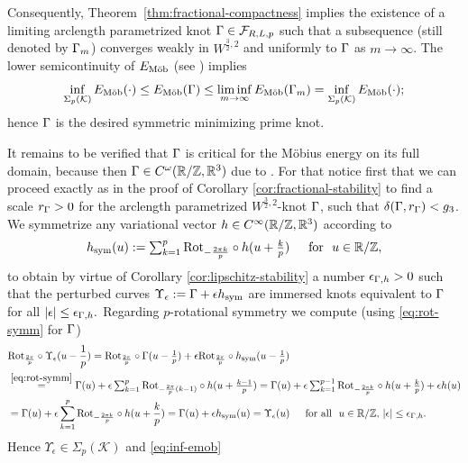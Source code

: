 Consequently, Theorem~\ref{thm:fractional-compactness} implies the existence
of a limiting arclength parametrized knot $\Gamma\in\mathcal{F}_{R,L,p}$ such that
a subsequence (still denoted by $\Gamma_m$) converges weakly in 
$W^{\frac32,2}$ and uniformly to $\Gamma$ as $m\to\infty$.
The 
lower semicontinuity of ${E_\textnormal{M\"ob}}$ (see \cite[Lemma 4.2]{freedman-etal_1994})
implies
\begin{equation}\label{eq:inf-emob}
\inf_{\Sigma_p(\mathcal{K})}{E_\textnormal{M\"ob}}(\cdot)
\le{E_\textnormal{M\"ob}}(\Gamma)\le\liminf_{m\to\infty}{E_\textnormal{M\"ob}}(\Gamma_m)=\inf_{\Sigma_p(\mathcal{K})}
{E_\textnormal{M\"ob}}(\cdot);
\end{equation}
hence $\Gamma$ is the desired symmetric minimizing prime knot.

It remains to be verified that $\Gamma$ is critical for the M\"obius energy on its full domain, because then $\Gamma\in C^\omega(\mathbb{R}/\mathbb{Z},\mathbb{R}^3)$ due to
\cite[Corollary 1.3]{blatt-vorderobermeier_2019}.
For that notice first that we can proceed exactly as
in the proof of Corollary \ref{cor:fractional-stability}
to find a scale $r_\Gamma>0$ for
the arclength parametrized $W^{\frac32,2}$-knot $\Gamma$, such that
$\delta(\Gamma,r_\Gamma)< g_3$.
We symmetrize any variational vector $h\in C^\infty(\mathbb{R}/\mathbb{Z},\mathbb{R}^3)$ according to
\begin{equation}\label{eq:symmetrize}
\textstyle
h_\textnormal{sym}(u):=\sum_{k=1}^p{\textnormal{Rot}}_{-\frac{2\pi k}p}\circ h(u+\frac{k}p)
\quad\,\,\,\text{for }\,\, u\in\mathbb{R}/\mathbb{Z},
\end{equation}
to obtain by virtue of Corollary \ref{cor:lipschitz-stability}
a number $\epsilon_{\Gamma,h}>0$ such that the perturbed curves
$\Upsilon_\epsilon:=\Gamma+\epsilon h_\textnormal{sym}$ are immersed knots
equivalent to $\Gamma$ for all $|\epsilon|\le\epsilon_{\Gamma,h}.$
Regarding $p$-rotational symmetry we compute (using \eqref{eq:rot-symm} for
$\Gamma$)
\begin{align*}
\textstyle
&{\textnormal{Rot}}_{\frac{2\pi}p}\circ\Upsilon_\epsilon(u-\frac1{p})
\textstyle
={\textnormal{Rot}}_{\frac{2\pi}p}\circ\Gamma(u-\frac1p)+\epsilon{\textnormal{Rot}}_{\frac{2\pi}p}\circ
h_\textnormal{sym}(u-\frac1p)\\
&\textstyle\overset{\eqref{eq:rot-symm}}{=}
\Gamma(u)+\epsilon\sum_{k=1}^p{\textnormal{Rot}}_{-\frac{2\pi}p(k-1)}\circ
h(u+\frac{k-1}p)
= \Gamma(u)+\epsilon\sum_{k=1}^{p-1}{\textnormal{Rot}}_{-\frac{2\pi k}p}
\circ h(u+\frac{k}p)+\epsilon h(u)\\
&=\Gamma(u)+\epsilon\sum_{k=1}^p
{\textnormal{Rot}}_{-\frac{2\pi k}p}\circ h(u+\frac{k}p)
 = \Gamma(u)+\epsilon h_\textnormal{sym}(u)=\Upsilon_\epsilon (u)\quad\,\,\,\text{for all }\,\,
u\in\mathbb{R}/\mathbb{Z},\,|\epsilon|\le\epsilon_{\Gamma,h}.
\end{align*}
Hence $\Upsilon_\epsilon\in\Sigma_p(\mathcal{K})$ and \eqref{eq:inf-emob}
